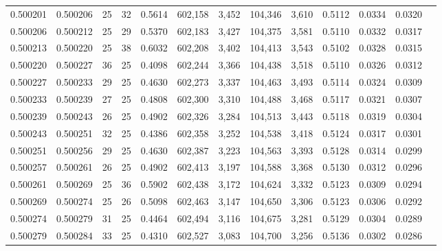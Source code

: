 \begin{tabular}{rrrrrrrrrrrrr}
0.500201 & 0.500206 &    25 &  32 &                                     0.5614 & 602,158 &   3,452 & 104,346 &   3,610 & 0.5112 & 0.0334 & 0.0320 \\
0.500206 & 0.500212 &    25 &  29 &                                     0.5370 & 602,183 &   3,427 & 104,375 &   3,581 & 0.5110 & 0.0332 & 0.0317 \\
0.500213 & 0.500220 &    25 &  38 &                                     0.6032 & 602,208 &   3,402 & 104,413 &   3,543 & 0.5102 & 0.0328 & 0.0315 \\
0.500220 & 0.500227 &    36 &  25 &                                     0.4098 & 602,244 &   3,366 & 104,438 &   3,518 & 0.5110 & 0.0326 & 0.0312 \\
0.500227 & 0.500233 &    29 &  25 &                                     0.4630 & 602,273 &   3,337 & 104,463 &   3,493 & 0.5114 & 0.0324 & 0.0309 \\
0.500233 & 0.500239 &    27 &  25 &                                     0.4808 & 602,300 &   3,310 & 104,488 &   3,468 & 0.5117 & 0.0321 & 0.0307 \\
0.500239 & 0.500243 &    26 &  25 &                                     0.4902 & 602,326 &   3,284 & 104,513 &   3,443 & 0.5118 & 0.0319 & 0.0304 \\
0.500243 & 0.500251 &    32 &  25 &                                     0.4386 & 602,358 &   3,252 & 104,538 &   3,418 & 0.5124 & 0.0317 & 0.0301 \\
0.500251 & 0.500256 &    29 &  25 &                                     0.4630 & 602,387 &   3,223 & 104,563 &   3,393 & 0.5128 & 0.0314 & 0.0299 \\
0.500257 & 0.500261 &    26 &  25 &                                     0.4902 & 602,413 &   3,197 & 104,588 &   3,368 & 0.5130 & 0.0312 & 0.0296 \\
0.500261 & 0.500269 &    25 &  36 &                                     0.5902 & 602,438 &   3,172 & 104,624 &   3,332 & 0.5123 & 0.0309 & 0.0294 \\
0.500269 & 0.500274 &    25 &  26 &                                     0.5098 & 602,463 &   3,147 & 104,650 &   3,306 & 0.5123 & 0.0306 & 0.0292 \\
0.500274 & 0.500279 &    31 &  25 &                                     0.4464 & 602,494 &   3,116 & 104,675 &   3,281 & 0.5129 & 0.0304 & 0.0289 \\
0.500279 & 0.500284 &    33 &  25 &                                     0.4310 & 602,527 &   3,083 & 104,700 &   3,256 & 0.5136 & 0.0302 & 0.0286 \\

\end{tabular}
